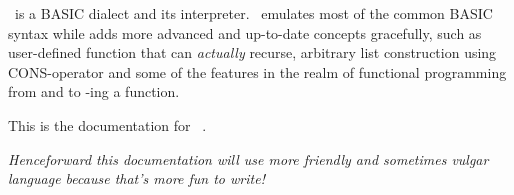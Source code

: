 \tbas\ is a BASIC dialect and its interpreter. \tbas\ emulates most of the common BASIC syntax while adds more advanced and up-to-date concepts gracefully, such as user-defined function that can \emph{actually} recurse, arbitrary list construction using CONS-operator and some of the features in the realm of functional programming from  and  to -ing a function.

This is the documentation for \tbas\ \tbasver.

\vfill

\small\emph{Henceforward this documentation will use more friendly and sometimes vulgar language because that's more fun to write!}
